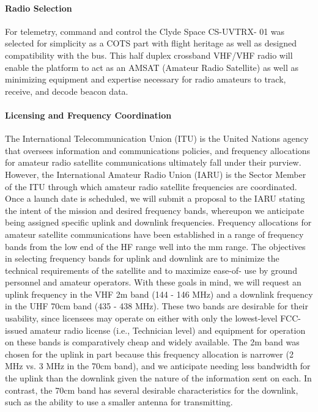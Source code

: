 \documentclass[nocover]            %
{CSLI}                       %
\begin{document}
\paragraph{Radio Selection\\}
For telemetry, command and control the Clyde Space CS-UVTRX- 01 was selected for simplicity as a COTS part with flight heritage as well as designed compatibility with the bus. This half duplex crossband VHF/VHF radio will enable the platform to act as an AMSAT (Amateur Radio Satellite) as well as minimizing equipment and expertise necessary for radio amateurs to track, receive, and decode beacon data. 
\paragraph{Licensing and Frequency Coordination\\}
The International Telecommunication Union (ITU) is the United Nations agency that oversees information and communications policies, and frequency allocations for amateur radio satellite communications ultimately fall under their purview. However, the International Amateur Radio Union (IARU) is the Sector Member of the ITU through which amateur radio satellite frequencies are coordinated. Once a launch date is scheduled, we will submit a proposal to the IARU stating the intent of the mission and desired frequency bands, whereupon we anticipate being assigned specific uplink and downlink frequencies. Frequency allocations for amateur satellite communications have been established in a range of frequency bands from the low end of the HF range well into the mm range. The objectives in selecting frequency bands for uplink and downlink are to minimize the technical requirements of the satellite and to maximize ease-of- use by ground personnel and amateur operators. With these goals in mind, we will request an uplink frequency in the VHF 2m band (144 - 146 MHz) and a downlink frequency in the UHF 70cm band (435 - 438 MHz). These two bands are desirable for their usability, since licensees may operate on either with only the lowest-level FCC-issued amateur radio license (i.e., Technician level) and equipment for operation on these bands is comparatively cheap and widely available. The 2m band was chosen for the uplink in part because this frequency allocation is narrower (2 MHz vs. 3 MHz in the 70cm band), and we anticipate needing less bandwidth for the uplink than the downlink given the nature of the information sent on each. In contrast, the 70cm band has several desirable characteristics for the downlink, such as the ability to use a smaller antenna for transmitting.
\end{document}
